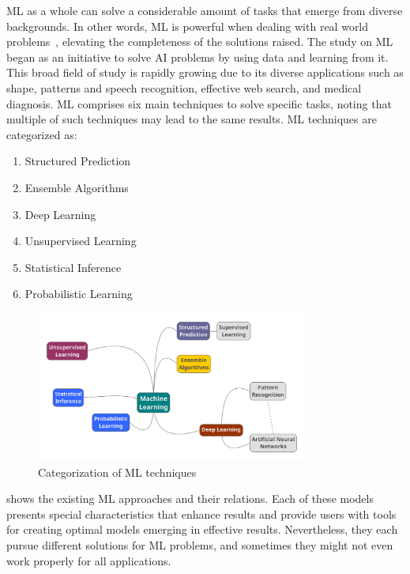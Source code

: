 \ac{ML} as a whole can solve a considerable amount of tasks that emerge from diverse backgrounds. 
In other words, \ac{ML} is powerful when dealing with real world problems~\cite{michalski13}, 
elevating the completeness of the solutions raised. 
The study on \ac{ML} began as an initiative to solve \ac{AI} problems by using data and learning from 
it. This broad field of study is rapidly growing due to its diverse applications such as shape, patterns 
and speech recognition, effective web search, and medical diagnosis. \ac{ML} comprises six main 
techniques to solve specific tasks, noting that multiple of such techniques may lead to the same 
results. \ac{ML} techniques are categorized as:
\begin{enumerate}
 \item Structured Prediction~\cite{taskar05}
 \item Ensemble Algorithms~\cite{dietterich00}
 \item Deep Learning~\cite{lecun15} 
 \item Unsupervised Learning~\cite{hastie09}
 \item Statistical Inference~\cite{robert14} 
 \item Probabilistic Learning~\cite{robert14}
\end{enumerate}

\begin{figure}[htbp]
  \centering
  \includegraphics[width=0.8\textwidth]{images/ai-categorization}
  \caption{Categorization of \acl{ML} techniques}
  \label{fig:ai-categorization}
\end{figure}

 shows the existing \ac{ML} approaches and their relations. Each of these 
models presents special characteristics that enhance results and provide users with tools for creating 
optimal models emerging in effective results.  Nevertheless, they each pursue different solutions for  
\ac{ML} problems, and sometimes they might not even work properly for all applications. 

